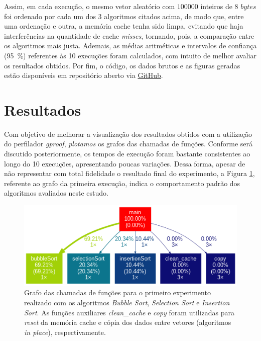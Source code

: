 \documentclass[12pt,a4paper]{article}
\begin{document}
Assim, em cada execução, o mesmo vetor aleatório com $100000$ inteiros de 8 $bytes$ foi ordenado por cada um dos 3 algoritmos citados acima, de modo que, entre uma ordenação e outra, a memória cache tenha sido limpa, evitando que haja interferências na quantidade de cache \textit{misses}, tornando, pois, a comparação entre os algoritmos mais justa. Ademais, as médias aritméticas e intervalos de confiança (\SI{95}{\percent}) referentes às 10 execuções foram calculados, com intuito de melhor avaliar os resultados obtidos. Por fim, o código, os dados brutos e as figuras geradas estão disponíveis em repositório aberto via \href{https://github.com/greffao/Optimizing-Code}{GitHub}.  

\section{Resultados}

Com objetivo de melhorar a visualização dos resultados obtidos com a utilização do perfilador \textit{gproof}, \textit{plotamos} os grafos das chamadas de funções. Conforme será discutido posteriormente, os tempos de execução foram bastante consistentes ao longo do 10 execuções, apresentando poucas variações. Dessa forma, apesar de não representar com total fidelidade o resultado final do experimento, a Figura \ref{fig:grafo}, referente ao grafo da primeira execução, indica o comportamento padrão dos algoritmos avaliados neste estudo.\protect\footnotemark


\begin{figure}[H]
\centering
\includegraphics[width=0.90\linewidth]{Figures/grafo.png}
\caption{Grafo das chamadas de funções para o primeiro experimento realizado com os algoritmos \textit{Bubble Sort}, \textit{Selection Sort} e \textit{Insertion Sort}. As funções auxiliares \textit{clean\_cache} e \textit{copy} foram utilizadas para \textit{reset} da memória cache e cópia dos dados entre vetores (algoritmos \textit{in place}), respectivamente.}
\label{fig:grafo}
\end{figure}
\end{document}
